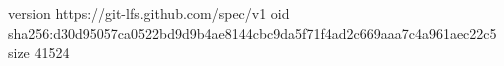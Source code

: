version https://git-lfs.github.com/spec/v1
oid sha256:d30d95057ca0522bd9d9b4ae8144cbc9da5f71f4ad2c669aaa7c4a961aec22c5
size 41524
